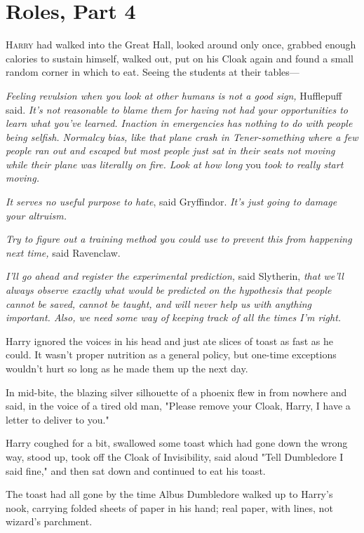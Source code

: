 \chapter{Roles, Part 4}

\lettrine{H}{arry} had walked
into the Great Hall, looked around only once, grabbed enough calories to
sustain himself, walked out, put on his Cloak again and found a small random
corner in which to eat. Seeing the students at their tables—

\emph{Feeling revulsion when you look at other humans is not a good sign,}
Hufflepuff said. \emph{It's not reasonable to blame them for having not had
your opportunities to learn what you've learned. Inaction in emergencies has
nothing to do with people being selfish. Normalcy bias, like that plane crash
in Tener-something where a few people ran out and escaped but most people just
sat in their seats not moving while their plane was literally on fire. Look at
how long} you \emph{took to really start moving.}

\emph{It serves no useful purpose to hate}, said Gryffindor. \emph{It's just
going to damage your altruism.}

\emph{Try to figure out a training method you could use to prevent this from
happening next time,} said Ravenclaw.

\emph{I'll go ahead and register the experimental prediction,} said Slytherin,
\emph{that we'll always observe exactly what would be predicted on the
hypothesis that people cannot be saved, cannot be taught, and will never help
us with anything important. Also, we need some way of keeping track of all the
times I'm right.}

Harry ignored the voices in his head and just ate slices of toast as fast as he
could. It wasn't proper nutrition as a general policy, but one-time exceptions
wouldn't hurt so long as he made them up the next day.

In mid-bite, the blazing silver silhouette of a phoenix flew in from nowhere
and said, in the voice of a tired old man, "Please remove your Cloak, Harry, I
have a letter to deliver to you."

Harry coughed for a bit, swallowed some toast which had gone down the wrong
way, stood up, took off the Cloak of Invisibility, said aloud "Tell Dumbledore
I said fine," and then sat down and continued to eat his toast.

The toast had all gone by the time Albus Dumbledore walked up to Harry's nook,
carrying folded sheets of paper in his hand; real paper, with lines, not
wizard's parchment.

